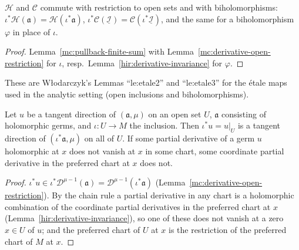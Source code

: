 \begin{lemma}
\label{mc:homogenized-etale}
\leanok
\(\mathcal H\) and \(\mathcal C\) commute with restriction to open sets and with biholomorphisms: \(\iota^*\mathcal H(\mathfrak a)=\mathcal H(\iota^*\mathfrak a)\),
\(\iota^*\mathcal C(\underline{\mathcal I})=\mathcal C(\iota^*\underline{\mathcal I})\), and the same for a biholomorphism \(\varphi\) in place of \(\iota\).
\end{lemma}
\begin{proof}
\leanok
Lemma~\ref{mc:pullback-finite-sum} with Lemma~\ref{mc:derivative-open-restriction} for \(\iota\), resp.\ Lemma~\ref{hir:derivative-invariance} for \(\varphi\).
\end{proof}
These are Włodarczyk's Lemmas ``le:etale2'' and ``le:etale3'' for the étale maps used in the analytic setting (open inclusions and biholomorphisms).

\begin{lemma}
\label{mc:tangent-direction-open}
\leanok
Let \(u\) be a tangent direction of \((\mathfrak a,\mu)\) on an open set \(U\), \(\mathfrak a\) consisting of holomorphic germs, and \(\iota\colon U\to M\) the
inclusion. Then \(\iota^*u=u|_U\) is a tangent direction of \((\iota^*\mathfrak a,\mu)\) on all of \(U\). If some partial derivative of a germ \(u\)
holomorphic at \(x\) does not vanish at \(x\) in some chart, some coordinate partial derivative in the preferred chart at \(x\) does not.
\end{lemma}
\begin{proof}
\leanok
\(\iota^*u\in\iota^*\mathcal D^{\mu-1}(\mathfrak a)=\mathcal D^{\mu-1}(\iota^*\mathfrak a)\) (Lemma~\ref{mc:derivative-open-restriction}). By the chain rule a
partial derivative in any chart is a holomorphic combination of the coordinate partial derivatives in the preferred chart at \(x\)
(Lemma~\ref{hir:derivative-invariance}), so one of these does not vanish at a zero \(x\in U\) of \(u\); and the preferred chart of \(U\) at \(x\) is the
restriction of the preferred chart of \(M\) at \(x\).
\end{proof}

